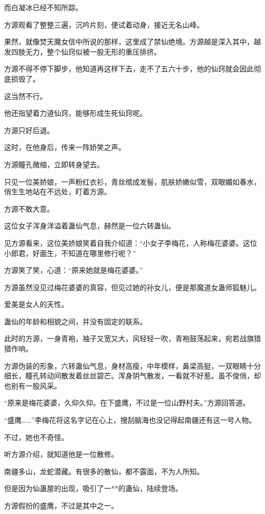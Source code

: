 \begin{this_body}
而白凝冰已经不知所踪。

方源观看了整整三遍，沉吟片刻，便试着动身，接近无名山峰。

果然，就像焚天魔女信中所说的那样，这里成了禁仙绝境。方源越是深入其中，越发四肢无力，整个仙窍似被一股无形的重压排挤。

方源不得不停下脚步，他知道再这样下去，走不了五六十步，他的仙窍就会因此彻底损毁了。

这当然不行。

他还指望着力道仙窍，能够形成生死仙窍呢。

方源只好后退。

这时，在他身后，传来一阵娇笑之声。

方源瞳孔微缩，立即转身望去。

只见一位美娇娘，一声粉红衣衫，青丝绾成发髻，肌肤娇嫩似雪，双眼媚如春水，俏生生地站在不远处，盯着方源。

方源不敢大意。

这位女子浑身洋溢着蛊仙气息，赫然是一位六转蛊仙。

见方源看来，这位美娇娘笑着自我介绍道：“小女子李梅花，人称梅花婆婆。这位小郎君，好面生，不知道在哪里修行呢？”

方源笑了笑，心道：“原来她就是梅花婆婆。”

方源虽然没见过梅花婆婆的真容，但见过她的孙女儿，便是那魔道女蛊师狐魅儿。

爱美是女人的天性。

蛊仙的年龄和相貌之间，并没有固定的联系。

此时的方源，一身青袍，袖子又宽又大，风轻轻一吹，青袍鼓荡起来，宛若战旗猎猎作响。

方源伪装的形象，六转蛊仙气息，身材高瘦，中年模样，鼻梁高挺，一双眼睛十分细长，瞳孔转动间散发着丝丝碧芒。浑身阴气散发，一看就不好惹。虽不俊俏，却也别有一股风采。

“原来是梅花婆婆，久仰久仰。在下盛鹰，不过是一位山野村夫。”方源回答道。

“盛鹰……”李梅花将这名字记在心上，搜刮脑海也没记得起南疆还有这一号人物。

不过，她也不奇怪。

听方源介绍，就知道他是一位散修。

南疆多山，龙蛇潜藏。有很多的散仙，都不露面，不为人所知。

但是因为仙蛊屋的出现，吸引了一**的蛊仙，陆续登场。

方源假扮的盛鹰，不过是其中之一。


\end{this_body}
